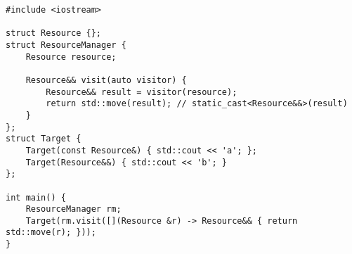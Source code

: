 \begin{lstlisting}[title=\href{https://godbolt.org/z/XYmsz5}{\texttt{godbolt.org/z/XYmsz5}}]
#include <iostream>

struct Resource {};
struct ResourceManager {
    Resource resource;

    Resource&& visit(auto visitor) {
        Resource&& result = visitor(resource);
        return std::move(result); // static_cast<Resource&&>(result)
    }
};
struct Target {
    Target(const Resource&) { std::cout << 'a'; };
    Target(Resource&&) { std::cout << 'b'; }
};

int main() {
    ResourceManager rm;
    Target(rm.visit([](Resource &r) -> Resource&& { return std::move(r); }));
}
\end{lstlisting}
